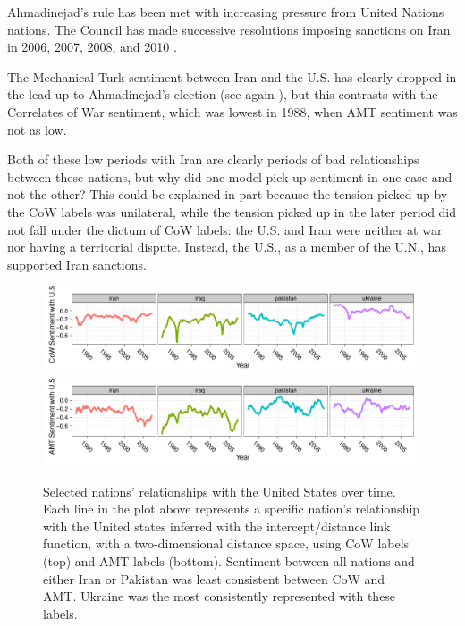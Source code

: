 \begin{itemize}
    Ahmadinejad's rule has been met with increasing pressure from
    United Nations nations.  The Council has made successive
    resolutions imposing sanctions on Iran in 2006, 2007, 2008, and
    2010 \citep{iranstate:2012}.

    The Mechanical Turk sentiment between Iran and the U.S. has
    clearly dropped in the lead-up to Ahmadinejad's election (see
    again ), but this contrasts
    with the Correlates of War sentiment, which was lowest in 1988,
    when AMT sentiment was not as low.

\end{itemize}
 
Both of these low periods with Iran are clearly periods of bad
relationships between these nations, but why did one model pick up
sentiment in one case and not the other?  This could be explained in
part because the tension picked up by the CoW labels was unilateral,
while the tension picked up in the later period did not fall under the
dictum of CoW labels: the U.S. and Iran were neither at war nor having
a territorial dispute.  Instead, the U.S., as a member of the U.N., has
supported Iran sanctions.


\begin{figure}
  \center
    \includegraphics[width=1\textwidth]{chapter_foreign_relations/figures/012_fr_cow_mutual_sentiment_with_us.pdf}
    \includegraphics[width=1\textwidth]{chapter_foreign_relations/figures/012_fr_mturk_mutual_sentiment_with_us.pdf}
  \label{fig:nation_positions_over_time}
  \caption{Selected nations' relationships with the United States
    over time.  Each line in the plot above represents a specific
    nation's relationship with the United states inferred with the
    intercept/distance link function, with a two-dimensional distance
    space, using CoW labels (top) and AMT labels (bottom).  Sentiment
    between all nations and either Iran or Pakistan was
    least consistent between CoW and AMT. Ukraine was
    the most consistently represented with these labels.}
\end{figure}

